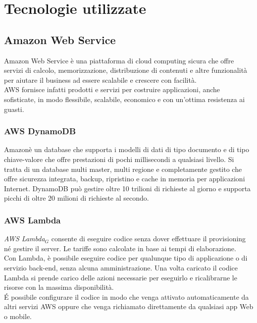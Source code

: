 \chapter{Tecnologie utilizzate}
\label{Tecnologie}
\section{Amazon Web Service}
Amazon Web Service è una piattaforma di cloud computing sicura che offre servizi di calcolo, memorizzazione, distribuzione di contenuti e altre funzionalità per aiutare il business ad essere scalabile e crescere con facilità. \\
AWS fornisce infatti prodotti e servizi per costruire applicazioni, anche sofisticate, in modo flessibile, scalabile, economico e  con un'ottima resistenza ai guasti. 
\subsection{AWS DynamoDB}
Amazonè un database che supporta i modelli di dati di tipo documento e di tipo chiave-valore che offre prestazioni di pochi millisecondi a qualsiasi livello. Si tratta di un database multi master, multi regione e completamente gestito che offre sicurezza integrata, backup, ripristino e cache in memoria per applicazioni Internet. DynamoDB può gestire oltre 10 trilioni di richieste al giorno e supporta picchi di oltre 20 milioni di richieste al secondo. 
\subsection{AWS Lambda}
\textit{AWS Lambda$_{G}$} consente di eseguire codice senza dover effettuare il provisioning né gestire il server. Le tariffe sono calcolate in base ai tempi di elaborazione.\\ 
Con Lambda, è possibile eseguire codice per qualunque tipo di applicazione o di servizio back-end, senza alcuna amministrazione. Una volta caricato il codice Lambda si prende carico delle azioni necessarie per eseguirlo e ricalibrarne le risorse con la massima disponibilità. \\
\'E possibile configurare il codice in modo che venga attivato automaticamente da altri servizi AWS oppure che venga richiamato direttamente da qualsiasi app Web o mobile.
